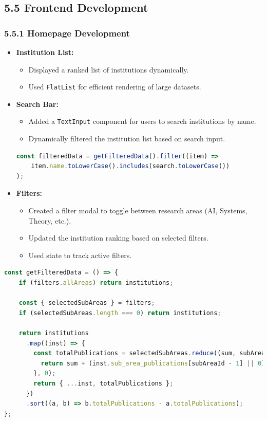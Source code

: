 \documentclass[12pt]{article}
\begin{document}
\subsection*{5.5 Frontend Development}

\subsubsection*{5.5.1 Homepage Development}
\begin{itemize}
    \item \textbf{Institution List:}
    \begin{itemize}
        \item Displayed a ranked list of institutions dynamically.
        \item Used \texttt{FlatList} for efficient rendering of large datasets.
    \end{itemize}

    \item \textbf{Search Bar:}
    \begin{itemize}
        \item Added a \texttt{TextInput} component for users to search institutions by name.
        \item Dynamically filtered the institution list based on search input.
    \end{itemize}
    \begin{lstlisting}[language=JavaScript, caption={Filtering Data by Search Term}, label={lst:filteredData}]
const filteredData = getFilteredData().filter((item) =>
    item.name.toLowerCase().includes(search.toLowerCase())
);
\end{lstlisting}

    \item \textbf{Filters:}
    \begin{itemize}
        \item Created a filter modal to toggle between research areas (AI, Systems, Theory, etc.).
        \item Updated the institution ranking based on selected filters.
        \item Used state to track active filters.
    \end{itemize}
\end{itemize}
\begin{lstlisting}[language=JavaScript, caption={Filtering Data by Sub-Areas}, label={lst:getFilteredData}]
const getFilteredData = () => {
    if (filters.allAreas) return institutions;

    const { selectedSubAreas } = filters;
    if (selectedSubAreas.length === 0) return institutions;

    return institutions
      .map((inst) => {
        const totalPublications = selectedSubAreas.reduce((sum, subAreaId) => {
          return sum + (inst.sub_area_publications[subAreaId - 1] || 0);
        }, 0);
        return { ...inst, totalPublications };
      })
      .sort((a, b) => b.totalPublications - a.totalPublications);
};
\end{lstlisting}
\end{document}
